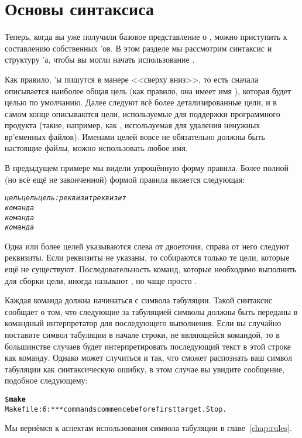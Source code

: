 \section{Основы синтаксиса \Makefile{}}
Теперь, когда вы уже получили базовое представление о \GNUmake{},
можно приступить к составлению собственных \Makefile{}'ов. В этом
разделе мы рассмотрим синтаксис и структуру \Makefile{}'а, чтобы вы
могли начать использование \GNUmake{}. 

Как правило, \Makefile{}'ы пишутся в манере <<сверху вниз>>, то есть
сначала описывается наиболее общая цель (как правило, она имеет имя
 
), которая будет целью по умолчанию. Далее следуют всё
более детализированные цели, и в самом конце описываются цели,
используемые для поддержки программного продукта (такие, например, как
, используемая для удаления ненужных вр'{е}менных
файлов). Именами целей вовсе не обязательно должны быть настоящие
файлы, можно использовать любое имя.

В предыдущем примере мы видели упрощённую форму правила. Более полной
(но всё ещё не законченной) формой правила является следующая:

{\footnotesize
\begin{alltt}
\emph{цель цель цель : реквизит реквизит
    команда
    команда
    команда
}
\end{alltt}
}

Одна или более целей указываются слева от двоеточия, справа от него
следуют реквизиты. Если реквизиты не указаны, то собираются только те
цели, которые ещё не существуют. Последовательность команд, которые
необходимо выполнить для сборки цели, иногда называют
, но чаще просто .

Каждая команда должна начинаться с символа табуляции. Такой синтаксис
сообщает \GNUmake{} о том, что следующие за табуляцией символы должны
быть переданы в командный интерпретатор для последующего выполнения.
Если вы случайно поставите символ табуляции в начале строки, не
являющейся командой, то в большинстве случаев \GNUmake{} будет
интерпретировать последующий текст в этой строке как команду. Однако
может случиться и так, что \GNUmake{} сможет распознать ваш символ
табуляции как синтаксическую ошибку, в этом случае вы увидите
сообщение, подобное следующему:

{\footnotesize
\begin{alltt}
\$ \textbf{make}
Makefile:6: *** commands commence before first target.  Stop.
\end{alltt}
}

Мы вернёмся к аспектам использования символа табуляции в
главе~\ref{chap:rules}.
